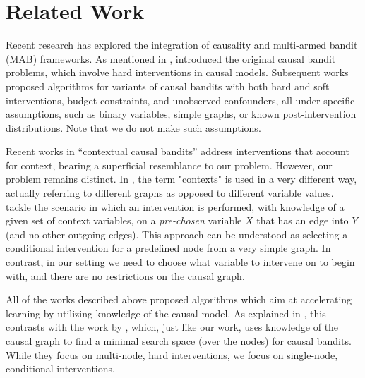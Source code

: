 \section{Related Work}
\label{sec:related-work}

Recent research has explored the integration of causality and multi-armed bandit (MAB) frameworks.
As mentioned in , \citet{lattimore2016bandits} introduced the original causal bandit problems, which involve hard interventions in causal models.
Subsequent works \citep{rajat2017identifying, yabe2018causal, lu2020regret, nair2021budgeted,sawarni2023learning,maiti2022causal,feng2023combinatorial} proposed algorithms for variants of causal bandits with both hard and soft interventions, budget constraints, and unobserved confounders, all under specific assumptions, such as binary variables, simple graphs, or known post-intervention distributions.
Note that we do not make such assumptions.

Recent works in ``contextual causal bandits'' address interventions that account for context, bearing a superficial resemblance to our problem.
However, our problem remains distinct.
In , the term "contexts" is used in a very different way, actually referring to different graphs as opposed to different variable values.
 tackle the scenario in which an intervention is performed, with knowledge of a given set of context variables, on a \emph{pre-chosen} variable $X$ that has an edge into $Y$ (and no other outgoing edges).
This approach can be understood as selecting a conditional intervention for a predefined node from a very simple graph.
In contrast, in our setting we need to choose what variable to intervene on to begin with, and there are no restrictions on the causal graph.

All of the works described above proposed algorithms which aim at accelerating learning by utilizing knowledge of the causal model.
As explained in , this contrasts with the work by \citet{lee2018structural,lee2019structural}, which, just like our work, uses knowledge of the causal graph to find a minimal search space (over the nodes) for causal bandits.
While they focus on multi-node, hard interventions, we focus on single-node, conditional interventions.

